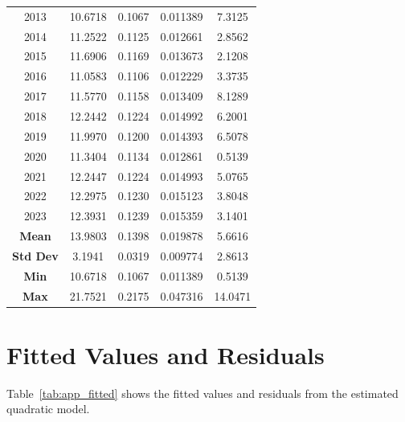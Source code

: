 \documentclass[12pt,a4paper]{report}
\theoremstyle{definition}
\theoremstyle{plain}
\theoremstyle{remark}
\begin{document}
\begin{longtable}{ccccc}
		2013 & 10.6718 & 0.1067 & 0.011389 & 7.3125 \\
		2014 & 11.2522 & 0.1125 & 0.012661 & 2.8562 \\
		2015 & 11.6906 & 0.1169 & 0.013673 & 2.1208 \\
		2016 & 11.0583 & 0.1106 & 0.012229 & 3.3735 \\
		2017 & 11.5770 & 0.1158 & 0.013409 & 8.1289 \\
		2018 & 12.2442 & 0.1224 & 0.014992 & 6.2001 \\
		2019 & 11.9970 & 0.1200 & 0.014393 & 6.5078 \\
		2020 & 11.3404 & 0.1134 & 0.012861 & 0.5139 \\
		2021 & 12.2447 & 0.1224 & 0.014993 & 5.0765 \\
		2022 & 12.2975 & 0.1230 & 0.015123 & 3.8048 \\
		2023 & 12.3931 & 0.1239 & 0.015359 & 3.1401 \\
		\midrule
		\textbf{Mean}    & 13.9803 & 0.1398 & 0.019878
		& 5.6616 \\
		\textbf{Std Dev} & 3.1941  & 0.0319 & 0.009774
		& 2.8613 \\
		\textbf{Min}     & 10.6718 & 0.1067 & 0.011389
		& 0.5139 \\
		\textbf{Max}     & 21.7521 & 0.2175 & 0.047316
		& 14.0471 \\
	\end{longtable}
	\clearpage
	\section{Fitted Values and Residuals}
	
	Table~\ref{tab:app_fitted} shows the fitted values
	and residuals from the estimated quadratic model.
	
\end{document}
